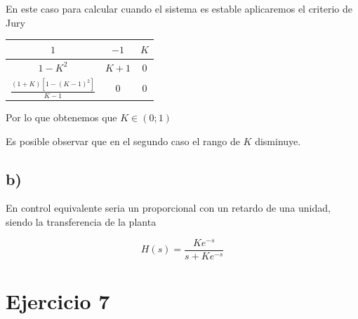 \documentclass{article}
\begin{document}
                    En este caso para calcular cuando el sistema es estable aplicaremos el criterio de Jury

                    \begin{table}[H]
                        \centering
                        \begin{tabular}{|c|c|c|}
                            \hline $1$ & $-1$ & $K$ \\
                            \hline $1-K^2$ & $K+1$ & 0 \\
                            \hline $\frac{(1+K)[ 1 - (K-1)^2 ]}{K-1}$ & 0 & 0\\
                            \hline
                        \end{tabular}
                    \end{table}

                    Por lo que obtenemos que $K \in (0;1)$


                Es posible observar que en el segundo caso el rango de $K$ disminuye.

            \subsection{b)}

                En control equivalente seria un proporcional con un retardo de una unidad, siendo la transferencia de la planta 

                \begin{equation}
                    H(s) = \frac{Ke^{-s}}{s + Ke^{-s}}
                \end{equation}

        \section{Ejercicio 7}

        
\end{document}
